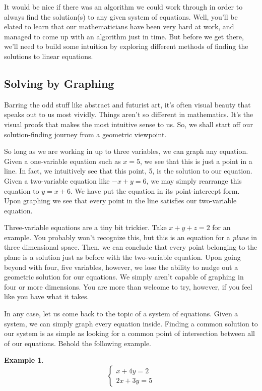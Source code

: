 \documentclass{scrbook}
\theoremstyle{definition}
\newtheorem{example}{Example}
\begin{document}
It would be nice if there was an algorithm we could work through in order to always find the solution(s) to any given system of equations. Well, you'll be elated to learn that our mathematicians have been very hard at work, and managed to come up with an algorithm just in time. But before we get there, we'll need to build some intuition by exploring different methods of finding the solutions to linear equations. 

\subsection{Solving by Graphing}

Barring the odd stuff like abstract and futurist art, it's often visual beauty that speaks out to us most vividly. Things aren't so different in mathematics. It's the visual proofs that makes the most intuitive sense to us. So, we shall start off our solution-finding journey from a geometric viewpoint.

So long as we are working in up to three variables, we can graph any equation. Given a one-variable equation such as $x = 5$, we see that this is just a point in a line. In fact, we intuitively see that this point, 5, is the solution to our equation. Given a two-variable equation like $-x + y = 6$, we may simply rearrange this equation to $y = x + 6$. We have put the equation in its point-intercept form. Upon graphing we see that every point in the line satisfies our two-variable equation.

Three-variable equations are a tiny bit trickier. Take $x + y + z = 2$ for an example. You probably won't recognize this, but this is an equation for a \textit{plane} in three dimensional space. Then, we can conclude that every point belonging to the plane is a solution just as before with the two-variable equation. Upon going beyond with four, five variables, however, we lose the ability to nudge out a geometric solution for our equations. We simply aren't capable of graphing in four or more dimensions. You are more than welcome to try, however, if you feel like you have what it takes.

In any case, let us come back to the topic of a system of equations. Given a system, we can simply graph every equation inside. Finding a common solution to our system is as simple as looking for a common point of intersection between all of our equations. Behold the following example.

\begin{example}
  \[
    \begin{cases}
      x + 4y = 2\\
      2x + 3y = 5
    \end{cases}
  \]
\end{example}
\end{document}
